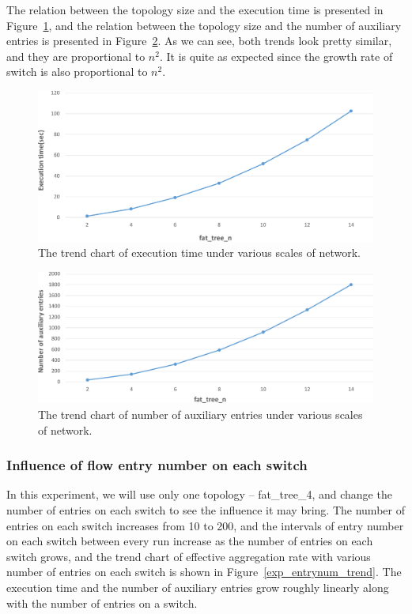 \documentclass[conference]{IEEEtran}
\begin{document}
The relation between the topology size and the execution time is presented in Figure~\ref{different_scale_time_trend}, and the relation between the topology size and the number of auxiliary entries is presented in Figure~\ref{different_scale_aux_trend}. As we can see, both trends look pretty similar, and they are proportional to $n^2$. It is quite as expected since the growth rate of switch is also proportional to $n^2$.

\begin{figure}[ht]
\centering 
\includegraphics[width=1\linewidth]{figures/exp_scale_time_trend.pdf}
\caption{The trend chart of execution time under various scales of network.}
\label{different_scale_time_trend}
\end{figure}

\begin{figure}[ht]
\centering 
\includegraphics[width=1\linewidth]{figures/exp_scale_aux_trend.pdf}
\caption{The trend chart of number of auxiliary entries under various scales of network.}
\label{different_scale_aux_trend}
\end{figure}

\subsubsection{Influence of flow entry number on each switch}
In this experiment, we will use only one topology -- fat\_tree\_4, and change the number of entries on each switch to see the influence it may bring. The number of entries on each switch increases from 10 to 200, and the intervals of entry number on each switch between every run increase as the number of entries on each switch grows, and the trend chart of effective aggregation rate with various number of entries on each switch is shown in Figure~\ref{exp_entrynum_trend}. The execution time and the number of auxiliary entries grow roughly linearly along with the number of entries on a switch.
\end{document}
